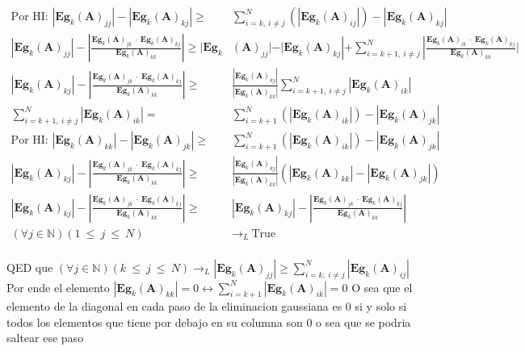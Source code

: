 \begin{align*}
    \text{Por HI: } |\textbf{Eg}_{k}(\textbf{A})_{jj}| - |\textbf{Eg}_{k}(\textbf{A})_{kj}| \geq &\sum_{i=k, \ i \neq j}^{N} (|\textbf{Eg}_{k}(\textbf{A})_{ij}|) -  |\textbf{Eg}_{k}(\textbf{A})_{kj}|\\
    |\textbf{Eg}_{k}(\textbf{A})_{jj}| - |\frac {\textbf{Eg}_{k}(\textbf{A})_{jk} \ \cdot \ \textbf{Eg}_{k}(\textbf{A})_{kj}}{\textbf{Eg}_{k}(\textbf{A})_{kk}}| \geq |\textbf{Eg}_{k}&(\textbf{A})_{jj}| - |\textbf{Eg}_{k}(\textbf{A})_{kj}| +  \sum_{i=k+1, \ i \neq j}^{N} |\frac{\textbf{Eg}_{k}(\textbf{A})_{ik} \ \cdot \ \textbf{Eg}_{k}(\textbf{A})_{kj}}{\textbf{Eg}_{k}(\textbf{A})_{kk}}| \\
    |\textbf{Eg}_{k}(\textbf{A})_{kj}| - |\frac {\textbf{Eg}_{k}(\textbf{A})_{jk} \ \cdot \ \textbf{Eg}_{k}(\textbf{A})_{kj}}{\textbf{Eg}_{k}(\textbf{A})_{kk}}| \geq  &\frac{ |\textbf{Eg}_{k}(\textbf{A})_{kj}|}{|\textbf{Eg}_{k}(\textbf{A})_{kk}|} \sum_{i=k+1, \ i \neq j}^{N} |\textbf{Eg}_{k}(\textbf{A})_{ik}|\\
    \sum_{i=k+1, \ i \neq j}^{N} |\textbf{Eg}_{k}(\textbf{A})_{ik}| = &\sum_{i=k+1}^{N} (|\textbf{Eg}_{k}(\textbf{A})_{ik}|) -  |\textbf{Eg}_{k}(\textbf{A})_{jk}|\\
    \text{Por HI: } |\textbf{Eg}_{k}(\textbf{A})_{kk}| -  |\textbf{Eg}_{k}(\textbf{A})_{jk}| \geq &\sum_{i=k+1}^{N} (|\textbf{Eg}_{k}(\textbf{A})_{ik}|) -  |\textbf{Eg}_{k}(\textbf{A})_{jk}|\\
    |\textbf{Eg}_{k}(\textbf{A})_{kj}| - |\frac {\textbf{Eg}_{k}(\textbf{A})_{jk} \ \cdot \ \textbf{Eg}_{k}(\textbf{A})_{kj}}{\textbf{Eg}_{k}(\textbf{A})_{kk}}| \geq  &\frac{ |\textbf{Eg}_{k}(\textbf{A})_{kj}|}{|\textbf{Eg}_{k}(\textbf{A})_{kk}|} (|\textbf{Eg}_{k}(\textbf{A})_{kk}| -  |\textbf{Eg}_{k}(\textbf{A})_{jk}|)\\
    |\textbf{Eg}_{k}(\textbf{A})_{kj}| - |\frac {\textbf{Eg}_{k}(\textbf{A})_{jk} \ \cdot \ \textbf{Eg}_{k}(\textbf{A})_{kj}}{\textbf{Eg}_{k}(\textbf{A})_{kk}}| \geq  &|\textbf{Eg}_{k}(\textbf{A})_{kj}| - |\frac {\textbf{Eg}_{k}(\textbf{A})_{jk} \ \cdot \ \textbf{Eg}_{k}(\textbf{A})_{kj}}{\textbf{Eg}_{k}(\textbf{A})_{kk}}|\\
    (\forall j \in 	\mathbb{N}) (1 \ \leq \ j \ \leq \ N ) &\longrightarrow_L \ \text{True} \\ 
\end{align*}

QED que $(\forall j \in \mathbb{N}) (k \ \leq \ j \ \leq \ N ) \longrightarrow_L |\textbf{Eg}_{k}(\textbf{A})_{jj}| \geq \sum_{i=k, \ i \neq j}^{N} |\textbf{Eg}_{k}(\textbf{A})_{ij}|$\\
Por ende el elemento $|\textbf{Eg}_{k}(\textbf{A})_{kk}| = 0 \leftrightarrow \sum_{i=k+1}^{N} |\textbf{Eg}_{k}(\textbf{A})_{ik}| = 0$
O sea que el elemento de la diagonal en cada paso de la eliminacion gaussiana es 0 si y solo si todos los elementos que tiene por debajo en su columna son 0 o sea que se podria saltear ese paso



